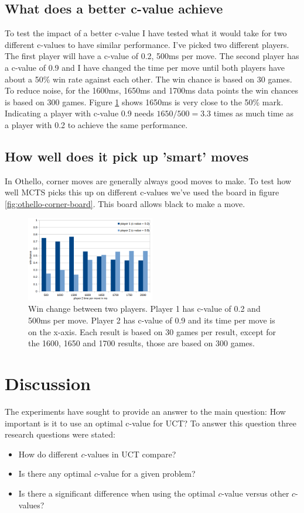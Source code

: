 \documentclass[11pt,a4paper]{article}
\begin{document}
\subsection{What does a better c-value achieve}
To test the impact of a better c-value I have tested what it would take for two different c-values to have similar performance. I've picked two different players. The first player will have a c-value  of 0.2, 500ms per move. The second player has a c-value of 0.9 and I have changed the time per move until both players have about a 50\% win rate against each other. The win chance is based on 30 games. To reduce noise, for the 1600ms, 1650ms and 1700ms data points the win chances is based on 300 games. Figure \ref{fig:mcts-significance} shows 1650ms is very close to the 50\% mark. Indicating a player with c-value 0.9 needs $1650/500 = 3.3$ times as much time as a player with 0.2 to achieve the same performance.

\subsection{How well does it pick up 'smart' moves}
In Othello, corner moves are generally always good moves to make. To test how well MCTS picks this up on different c-values we've used the board in figure \ref{fig:othello-corner-board}. This board allows black to make a move.

\begin{figure}
	\centering
	\includegraphics[width=0.5\textwidth]{images/mcts-significance}
	\caption{Win change between two players. Player 1 has c-value of 0.2 and 500ms per move. Player 2 has c-value of 0.9 and its time per move is on the x-axis. Each result is based on 30 games per result, except for the 1600, 1650 and 1700 results, those are based on 300 games.}
	\label{fig:mcts-significance}
\end{figure}

\section{Discussion}
The experiments have sought to provide an answer to the main question: How important is it to use an optimal c-value for UCT? To answer this question three research questions were stated:
\begin{itemize}
	\item How do different $c$-values in UCT compare?
	\item Is there any optimal $c$-value for a given problem?
	\item Is there a significant difference when using the optimal $c$-value versus other $c$-values?
\end{itemize}
\end{document}
